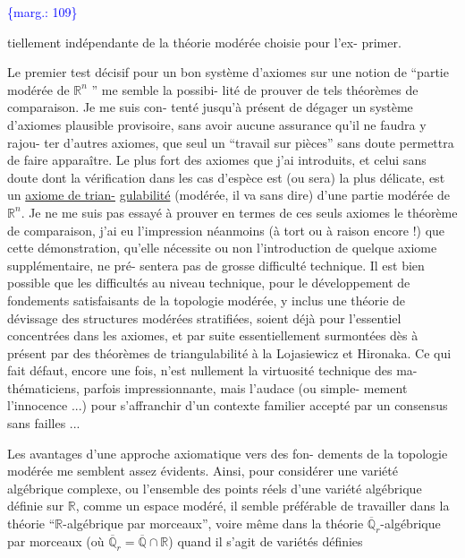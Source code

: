 \documentclass[11pt]{article}
\newcommand{\scanpage}[1]{\par\bigskip\noindent{\small\sffamily[scan #1]}\par}
\newcommand{\mspage}[1]{{\small\sffamily[p.\,#1]}}
\newcommand{\margin}[1]{\textcolor{blue}{\{\textsf{marg.:} #1\}}}
\newcommand{\uline}[1]{\underline{#1}}
\begin{document}
\margin{109}

\clearpage
\scanpage{119/110}
\mspage{32}

tiellement indépendante de la théorie modérée choisie pour l'ex-%
primer.

Le premier test décisif pour un bon système d'axiomes
sur une notion de ``partie modérée de $\mathbb{R}^n$ '' me semble la possibi-%
lité de prouver de tels théorèmes de comparaison. Je me suis con-%
tenté jusqu'à présent de dégager un système d'axiomes plausible
provisoire, sans avoir aucune assurance qu'il ne faudra y rajou-%
ter d'autres axiomes, que seul un ``travail sur pièces'' sans doute
permettra de faire apparaître. Le plus fort des axiomes que j'ai
introduits, et celui sans doute dont la vérification dans les cas
d'espèce est (ou sera) la plus délicate, est un \uline{axiome de trian-}%
\uline{gulabilité} (modérée, il va sans dire) d'une partie modérée de $\mathbb{R}^n$.
Je ne me suis pas essayé à prouver en termes de ces seuls axiomes
le théorème de comparaison, j'ai eu l'impression néanmoins (à tort
ou à raison encore !) que cette démonstration, qu'elle nécessite
ou non l'introduction de quelque axiome supplémentaire, ne pré-%
sentera pas de grosse difficulté technique. Il est bien possible
que les difficultés au niveau technique, pour le développement
de fondements satisfaisants de la topologie modérée, y inclus une
théorie de dévissage des structures modérées stratifiées, soient
déjà pour l'essentiel concentrées dans les axiomes, et par suite
essentiellement surmontées dès à présent par des théorèmes de
triangulabilité à la Lojasiewicz et Hironaka. Ce qui fait défaut,
encore une fois, n'est nullement la virtuosité technique des ma-%
thématiciens, parfois impressionnante, mais l'audace (ou simple-%
mement l'innocence ...) pour s'affranchir d'un contexte familier
accepté par un consensus sans failles ...

Les avantages d'une approche axiomatique vers des fon-%
dements de la topologie modérée me semblent assez évidents. Ainsi,
pour considérer une variété algébrique complexe, ou l'ensemble des
points réels d'une variété algébrique définie sur $\mathbb{R}$, comme un
espace modéré, il semble préférable de travailler dans la théorie
``$\mathbb{R}$-algébrique par morceaux'', voire même dans la théorie $\overline{\mathbb{Q}}_r$-algébrique
par morceaux (où $\overline{\mathbb{Q}}_r = \overline{\mathbb{Q}} \cap \mathbb{R}$) quand il s'agit de variétés définies
\end{document}
